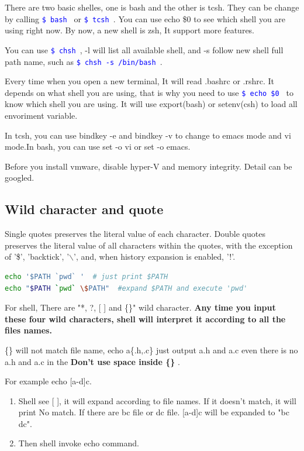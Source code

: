 \documentclass[paper=8.5in:11in, twoside, 12pt, pagesize=pdftex]{book}
\newcommand{\linuxcommand}[1]{\texttt{\textcolor{blue}{\$ #1 \Pisymbol{psy}{191}}}}
\begin{document}
		There are two basic shelles, one is bash and the other is tcsh. They can be change by calling \linuxcommand{bash} or \linuxcommand{tcsh}.  You can use echo \$0 to see which shell you are using right now. By now, a new shell is zsh, It support more features. 

		You can use \linuxcommand{chsh}, -l will list all available shell, and -s follow new shell full path name, such as \linuxcommand{chsh -s /bin/bash}.

		Every time when you open a new terminal, It will read .bashrc or .rshrc. It depends on what shell you are using, that is why you need to use \linuxcommand{echo \$0} to know which shell you are using. It will use export(bash) or setenv(csh) to load all envoriment variable. 

		In tcsh, you can use bindkey -e and bindkey -v to change to emacs mode and vi mode.In bash, you can use set -o vi or set -o emacs.

Before you install vmware, disable hyper-V and memory integrity. Detail can be googled.

\subsection{Wild character and quote}

Single quotes preserves the literal value of each character.  Double quotes preserves the literal value of all characters within the quotes, with the exception of '\$', 'backtick', '$\backslash$', and, when history expansion is enabled, '!'. 
\begin{lstlisting}[language=bash, mathescape = false]
echo '$PATH `pwd` '  # just print $PATH
echo "$PATH `pwd` \$PATH"  #expand $PATH and execute 'pwd'
\end{lstlisting}

For shell, There are "*, ?, [ ] and \{\}" wild character. \textbf{Any time you input these four wild characters, shell will interpret it according to all the files names.}

\{\} will not match file name, echo a\{.h,.c\} just output a.h and a.c even there is no a.h and a.c in the  \textbf{Don't use space inside \{\} }.

For example echo [a-d]c.  
\begin{enumerate}
	\item Shell see [ ], it will expand according to file names. If it doesn't match, it will print No match. If there are bc file or dc file. [a-d]c will be expanded to "bc dc".
						
	\item Then shell invoke echo command.
\end{enumerate}
\end{document}
